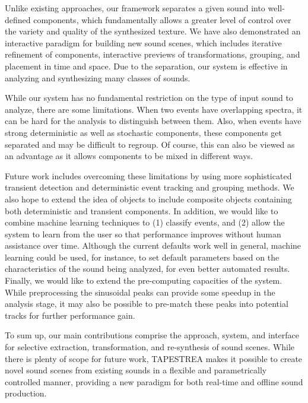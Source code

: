 \documentclass[review]{acmsiggraph}      %
\begin{document}
Unlike existing approaches, our framework separates a given sound into well-defined 
components, which fundamentally allows a greater 
level of control over the variety and quality of the synthesized texture.
We have also demonstrated an interactive paradigm for building new sound scenes, which 
includes iterative refinement of components, interactive previews of transformations, 
grouping, and placement 
in time and space.  Due to the separation, our system is effective in analyzing and 
synthesizing many classes of sounds. %

While our system has no fundamental restriction on the type of input sound to analyze,
there are some limitations. When two events have overlapping spectra, it can be hard for the
analysis to distinguish between them. Also, when events have strong deterministic as well as 
stochastic components, these components get separated and may be difficult to regroup. 
Of course, this can also be viewed as an advantage as it allows components to be 
mixed in different ways. 

Future work includes overcoming these limitations by using more sophisticated transient 
detection and deterministic event tracking and grouping methods. We also hope to extend the 
idea of objects to include composite objects containing both deterministic and transient 
components. In addition, we would like to combine machine learning techniques to (1) classify 
events, and (2) allow the system to learn from the user so that performance improves without 
human assistance over time. Although the current defaults work well in general, machine 
learning could be used, for instance, to set  default parameters based on the characteristics 
of the sound being analyzed, for even better automated results. Finally, we would like to 
extend the pre-computing capacities of the system. While preprocessing the sinusoidal peaks 
can provide some speedup in the analysis stage, it may also be possible to pre-match these 
peaks into potential tracks for further performance gain. 

To sum up, our main contributions comprise the approach, system, and interface for 
selective extraction, transformation, and re-synthesis of sound scenes.  While there is 
plenty of scope for future work, TAPESTREA makes it possible to create novel sound scenes 
from existing sounds in a flexible and parametrically controlled manner, providing a new paradigm for both real-time and offline sound production.



\nocite{*}

\end{document}
